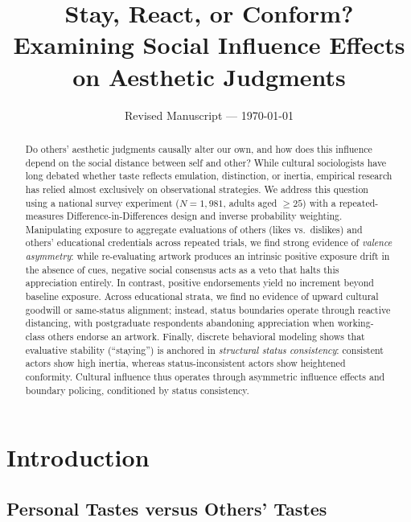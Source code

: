 \documentclass[12pt, letterpaper]{article}
\title{Stay, React, or Conform? Examining Social Influence Effects on Aesthetic Judgments}
\author{}
\date{Revised Manuscript --- \today}
\begin{document}
\maketitle

\begin{abstract}
Do others' aesthetic judgments causally alter our own, and how does this influence depend on the social distance between self and other? While cultural sociologists have long debated whether taste reflects emulation, distinction, or inertia, empirical research has relied almost exclusively on observational strategies. We address this question using a national survey experiment ($N = 1,981$, adults aged $\ge 25$) with a repeated-measures Difference-in-Differences design and inverse probability weighting. Manipulating exposure to aggregate evaluations of others (likes vs.\ dislikes) and others' educational credentials across repeated trials, we find strong evidence of \textit{valence asymmetry}: while re-evaluating artwork produces an intrinsic positive exposure drift in the absence of cues, negative social consensus acts as a veto that halts this appreciation entirely. In contrast, positive endorsements yield no increment beyond baseline exposure. Across educational strata, we find no evidence of upward cultural goodwill or same-status alignment; instead, status boundaries operate through reactive distancing, with postgraduate respondents abandoning appreciation when working-class others endorse an artwork. Finally, discrete behavioral modeling shows that evaluative stability (``staying'') is anchored in \textit{structural status consistency}: consistent actors show high inertia, whereas status-inconsistent actors show heightened conformity. Cultural influence thus operates through asymmetric influence effects and boundary policing, conditioned by status consistency.
\end{abstract}

\newpage
\section{Introduction}

\subsection{Personal Tastes versus Others' Tastes}
\end{document}
